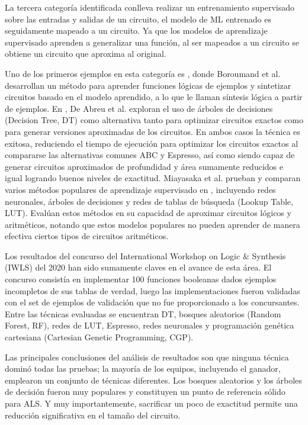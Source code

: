 La tercera categoría identificada conlleva realizar un entrenamiento supervisado
sobre las entradas y salidas de un circuito, el modelo de ML entrenado es
seguidamente mapeado a un circuito. Ya que los modelos de aprendizaje
supervisado aprenden a generalizar una función, al ser mapeados a un circuito
se obtiene un circuito que aproxima al original.

Uno de los primeros ejemplos en esta categoría es
\cite{boroumand_learning_2021}, donde Boroumand et al. desarrollan un método
para aprender funciones lógicas de ejemplos y sintetizar circuitos basado en el
modelo aprendido, a lo que le llaman síntesis lógica a partir de ejemplos. En
\cite{de_abreu_fast_2021}, De Abreu et al. exploran el uso de árboles de
decisiones (Decision Tree, DT) como alternativa tanto para optimizar
circuitos exactos como para generar versiones aproximadas de los circuitos. En
ambos casos la técnica es exitosa, reduciendo el tiempo de ejecución para
optimizar los circuitos exactos al compararse las alternativas comunes ABC y
Espresso, así como siendo capaz de generar circuitos aproximados de profundidad
y área sumamente reducidos e igual logrando buenos niveles de exactitud.
Miayasaka et al. prueban y comparan varios métodos populares de aprendizaje
supervisado en \cite{miyasaka_logic_2021}, incluyendo redes neuronales, árboles
de decisiones y redes de tablas de búsqueda (Lookup Table, LUT).
Evalúan estos métodos en su capacidad de aproximar circuitos lógicos y
aritméticos, notando que estos modelos populares no pueden aprender de manera
efectiva ciertos tipos de circuitos aritméticos.

Los resultados del concurso del International Workshop on Logic \& Synthesis
(IWLS) del 2020 \cite{rai_logic_2021} han sido sumamente claves en el avance de
esta área. El concurso consistía en implementar 100 funciones booleanas dados
ejemplos incompletos de sus tablas de verdad, luego las implementaciones fueron
validadas con el set de ejemplos de validación que no fue proporcionado a los
concursantes. Entre las técnicas evaluadas se encuentran DT, bosques
aleatorios (Random Forest, RF), redes de LUT, Espresso, redes neuronales y
programación genética cartesiana (Cartesian Genetic Programming, CGP).

Las principales conclusiones del análisis de resultados son que ninguna
técnica dominó todas las pruebas; la mayoría de los equipos, incluyendo el
ganador, emplearon un conjunto de técnicas diferentes. Los bosques aleatorios
y los árboles de decisión fueron muy populares y constituyen un punto de
referencia sólido para ALS. Y muy importantemente, sacrificar un poco de exactitud permite una
reducción significativa en el tamaño del circuito.

